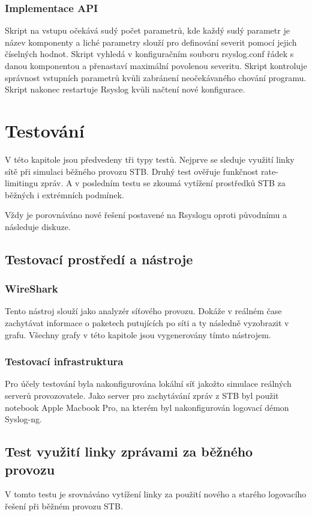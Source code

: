\documentclass[thesis=B,czech]{FITthesis}[2012/06/26]
\begin{document}
\subsection{Implementace API}
Skript na vstupu očekává sudý počet parametrů, kde každý sudý parametr je název komponenty a liché parametry slouží pro definování severit pomocí jejich číselných hodnot.
Skript vyhledá v konfiguračním souboru rsyslog.conf řádek s danou komponentou a přenastaví maximální povolenou severitu. Skript kontroluje správnost vstupních parametrů kvůli zabránení neočekávaného chování programu. Skript nakonec restartuje Rsyslog kvůli načtení nové konfigurace.


\chapter{Testování}
V této kapitole jsou předvedeny tři typy testů.
Nejprve se sleduje využití linky sítě při simulaci běžného provozu STB. Druhý test ověřuje funkčnost rate-limitingu zpráv. A v posledním testu se zkoumá vytížení prostředků STB za běžných i extrémních podmínek.

Vždy je porovnáváno nové řešení postavené na Rsyslogu oproti původnímu a následuje diskuze.

\section{Testovací prostředí a nástroje}

\subsection{WireShark}
Tento nástroj slouží jako analyzér síťového provozu. Dokáže v reálném čase zachytávat informace o paketech putujících po síti a ty následně vyzobrazit v grafu. Všechny grafy v této kapitole jsou vygenerovány tímto nástrojem.

\subsection{Testovací infrastruktura}
Pro účely testování byla nakonfigurována lokální síť jakožto simulace reálných serverů provozovatele. Jako server pro zachytávání zpráv z STB byl použit notebook Apple Macbook Pro, na kterém byl nakonfigurován logovací démon Syslog-ng.

\section{Test využití linky zprávami za běžného provozu}
 V tomto testu je srovnáváno vytížení linky za použití nového a starého logovacího řešení při běžném provozu STB. 
\end{document}
